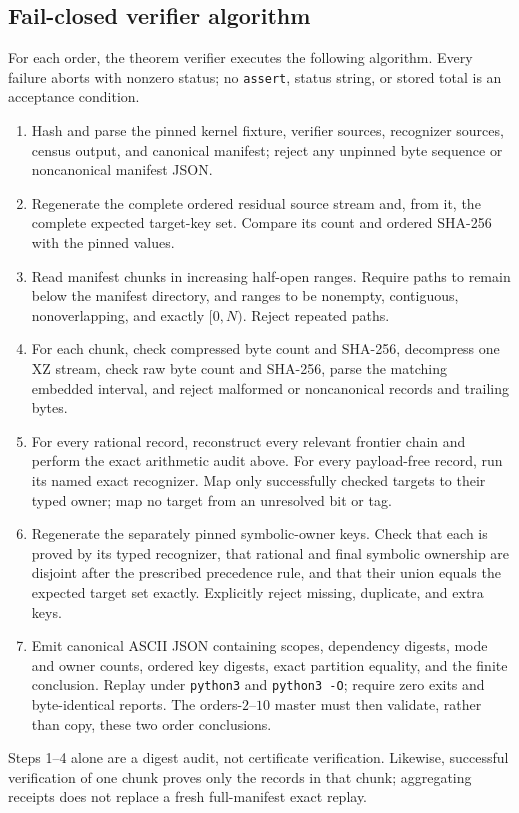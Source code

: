 \documentclass[11pt]{article}
\theoremstyle{definition}
\theoremstyle{remark}
\begin{document}
\subsection{Fail-closed verifier algorithm}

For each order, the theorem verifier executes the following algorithm.
Every failure aborts with nonzero status; no \texttt{assert}, status string, or
stored total is an acceptance condition.
\begin{enumerate}
\item Hash and parse the pinned kernel fixture, verifier sources, recognizer
sources, census output, and canonical manifest; reject any unpinned byte
sequence or noncanonical manifest JSON.
\item Regenerate the complete ordered residual source stream and, from it, the
complete expected target-key set.  Compare its count and ordered SHA-256 with
the pinned values.
\item Read manifest chunks in increasing half-open ranges.  Require paths to
remain below the manifest directory, and ranges to be nonempty, contiguous,
nonoverlapping, and exactly $[0,N)$.  Reject repeated paths.
\item For each chunk, check compressed byte count and SHA-256, decompress one XZ
stream, check raw byte count and SHA-256, parse the matching embedded interval,
and reject malformed or noncanonical records and trailing bytes.
\item For every rational record, reconstruct every relevant frontier chain and
perform the exact arithmetic audit above.  For every payload-free record, run
its named exact recognizer.  Map only successfully checked targets to their
typed owner; map no target from an unresolved bit or tag.
\item Regenerate the separately pinned symbolic-owner keys.  Check that each is
proved by its typed recognizer, that rational and final symbolic ownership are
disjoint after the prescribed precedence rule, and that their union equals the
expected target set exactly.  Explicitly reject missing, duplicate, and extra
keys.
\item Emit canonical ASCII JSON containing scopes, dependency digests, mode and
owner counts, ordered key digests, exact partition equality, and the finite
conclusion.  Replay under \texttt{python3} and \texttt{python3 -O};
require zero exits and byte-identical reports.  The orders-$2$--$10$ master must
then validate, rather than copy, these two order conclusions.
\end{enumerate}
Steps 1--4 alone are a digest audit, not certificate verification.  Likewise,
successful verification of one chunk proves only the records in that chunk;
aggregating receipts does not replace a fresh full-manifest exact replay.
\end{document}
